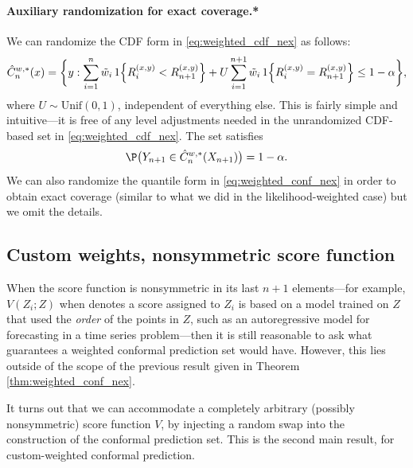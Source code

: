 \documentclass{article}
\begin{document}
\paragraph{Auxiliary randomization for exact coverage.*}

We can randomize the CDF form in \eqref{eq:weighted_cdf_nex} as follows: 
\[
\hat{C}_n^{w,*}(x) = \bigg\{ y : \sum_{i=1}^n \tilde{w}_i \, 1\Big\{ R_i^{(x,y)} <
R^{(x,y)}_{n+1} \Big\} + U \sum_{i=1}^{n+1} \tilde{w}_i \, 1\Big\{ R_i^{(x,y)} =
R^{(x,y)}_{n+1} \Big\} \leq 1-\alpha \bigg\},
\]
where $U \sim \mathrm{Unif}(0,1)$, independent of everything else. This is
fairly simple and intuitive---it is free of any level adjustments needed in the   
unrandomized CDF-based set in \eqref{eq:weighted_cdf_nex}. The set
 satisfies
\[
\P\big( Y_{n+1} \in \hC^{w,*}_n(X_{n+1}) \big) = 1-\alpha.  
\]
We can also randomize the quantile form in \eqref{eq:weighted_conf_nex} in order
to obtain exact coverage (similar to what we did in the likelihood-weighted
case) but we omit the details. 

\subsection{Custom weights, nonsymmetric score function}

When the score function is nonsymmetric in its last $n+1$ elements---for
example, $V(Z_i; Z)$ when denotes a score assigned to $Z_i$ is based on a model
trained on $Z$ that used the \emph{order} of the points in $Z$, such as an
autoregressive model for forecasting in a time series problem---then it is still
reasonable to ask what guarantees a weighted conformal prediction set would
have. However, this lies outside of the scope of the previous result given in
Theorem \ref{thm:weighted_conf_nex}.  

It turns out that we can accommodate a completely arbitrary (possibly
nonsymmetric) score function $V$, by injecting a random swap into the
construction of the conformal prediction set. This is the second main result,
for custom-weighted conformal prediction.      
\end{document}

